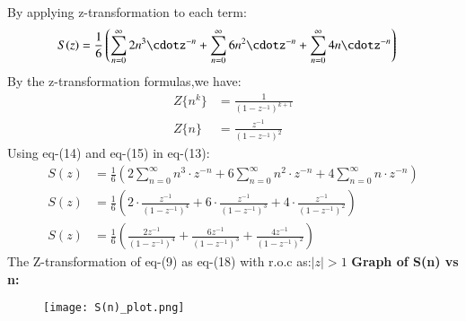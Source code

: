 \documentclass[journal,12pt,twocolumn]{IEEEtran}
\theoremstyle{remark}
\begin{document}
By applying z-transformation to each term:
\begin{align}
    S(z)&=\frac{1}{6}\left(\sum_{n=0}^{\infty}2n^3 \cdotz^{-n}+\sum_{n=0}^{\infty}6n^2\cdotz^{-n}+\sum_{n=0}^{\infty}4n\cdotz^{-n}\right)
\end{align}
By the z-transformation formulas,we have:
\begin{align}
     Z\{n^k\}&=\frac{1}{(1-z^{-1})^{k+1}}\\
     Z\{n\}&=\frac{z^{-1}}{(1-z^{-1})^2}
\end{align}
Using eq-(14) and eq-(15) in eq-(13):
\begin{align}
    S(z)&=\frac{1}{6} \left( 2 \sum_{n=0}^{\infty} n^3 \cdot z^{-n} + 6 \sum_{n=0}^{\infty} n^2 \cdot z^{-n} + 4 \sum_{n=0}^{\infty} n \cdot z^{-n} \right)\\
    S(z)&=\frac{1}{6} \left( 2 \cdot \frac{z^{-1}}{(1-z^{-1})^4} + 6 \cdot \frac{z^{-1}}{(1-z^{-1})^3} + 4 \cdot \frac{z^{-1}}{(1-z^{-1})^2} \right)\\
    S(z)&=\frac{1}{6} \left( \frac{2z^{-1}}{(1-z^{-1})^4} + \frac{6z^{-1}}{(1-z^{-1})^3} + \frac{4z^{-1}}{(1-z^{-1})^2} \right)
\end{align}
The Z-transformation of eq-(9) as eq-(18) with r.o.c as:$|z|>1$
\newpage
\textbf{Graph of S(n) vs n:}
\begin{figure}[h]
        \centering
\texttt{[image: S(n)\_plot.png]}
    \end{figure}
\end{document}
